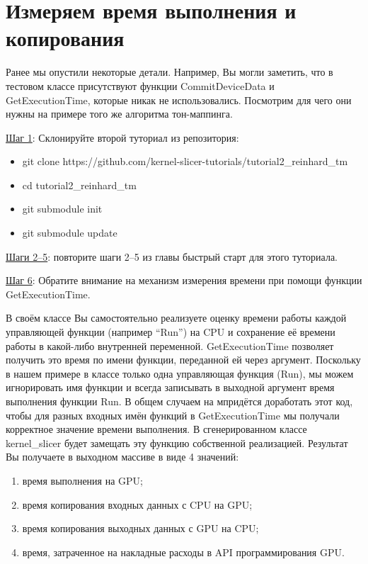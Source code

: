 \documentclass[11pt,fleqn,english,russian]{report} %
\begin{document}
\section{Измеряем время выполнения и копирования}

Ранее мы опустили некоторые детали. Например, Вы могли заметить, что в тестовом классе присутствуют функции CommitDeviceData и GetExecutionTime, которые никак не использовались. Посмотрим для чего они нужны на примере того же алгоритма тон-маппинга.

\noindent\underline{Шаг 1}: Склонируйте второй туториал из репозитория:

\begin{itemize}
	\item git clone https://github.com/kernel-slicer-tutorials/tutorial2\_reinhard\_tm
	\item cd tutorial2\_reinhard\_tm
	\item git submodule init
	\item git submodule update
\end{itemize}

\vspace*{5px}
\noindent\underline{Шаги 2--5}: повторите шаги 2--5 из главы быстрый старт для этого туториала. 

\vspace*{5px}
\noindent\underline{Шаг 6}: Обратите внимание на механизм измерения времени при помощи функции GetExecutionTime. 

В своём классе Вы самостоятельно реализуете оценку времени работы каждой управляющей функции (например ``Run'') на CPU и сохранение её времени работы в какой-либо внутренней переменной. GetExecutionTime позволяет получить это время по имени функции, переданной ей через аргумент. Поскольку в нашем примере в классе только одна управляющая функция (Run), мы можем игнорировать имя функции и всегда записывать в выходной аргумент время выполнения функции Run. В общем случаем на мпридётся доработать этот код, чтобы для разных входных имён функций в GetExecutionTime мы получали корректное значение времени выполнения. В сгенерированном классе kernel\_slicer будет замещать эту функцию собственной реализацией. Результат Вы получаете в выходном массиве в виде 4 значений: 

\begin{enumerate}
\item время выполнения на GPU;
\item время копирования входных данных с CPU на GPU;
\item время копирования выходных данных с GPU на CPU;
\item время, затраченное на накладные расходы в API программирования GPU.
\end{enumerate}
\end{document}
